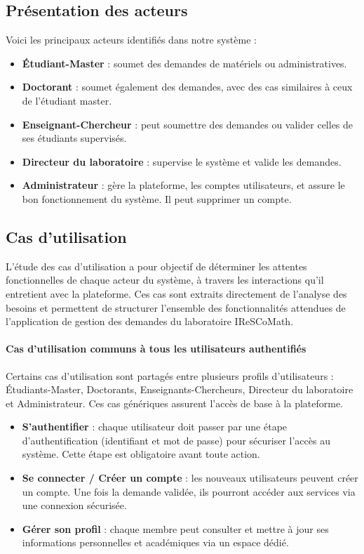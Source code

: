 \subsection{Présentation des acteurs}

Voici les principaux acteurs identifiés dans notre système :

\begin{itemize}
  \item \textbf{Étudiant-Master} : soumet des demandes de matériels ou administratives.
  \item \textbf{Doctorant} : soumet également des demandes, avec des cas similaires à ceux de l'étudiant master.
  \item \textbf{Enseignant-Chercheur} : peut soumettre des demandes ou valider celles de ses étudiants supervisés.
  \item \textbf{Directeur du laboratoire} : supervise le système et valide les demandes.
  \item \textbf{Administrateur} : gère la plateforme, les comptes utilisateurs, et assure le bon fonctionnement du système. Il peut supprimer un compte.
\end{itemize}


\subsection{Cas d’utilisation }

L’étude des cas d’utilisation a pour objectif de déterminer les attentes fonctionnelles de chaque acteur du système, à travers les interactions qu’il entretient avec la plateforme. Ces cas sont extraits directement de l’analyse des besoins et permettent de structurer l’ensemble des fonctionnalités attendues de l’application de gestion des demandes du laboratoire IReSCoMath.

\paragraph{Cas d’utilisation communs à tous les utilisateurs authentifiés}

Certains cas d’utilisation sont partagés entre plusieurs profils d’utilisateurs : Étudiants-Master, Doctorants, Enseignants-Chercheurs, Directeur du laboratoire et Administrateur. Ces cas génériques assurent l’accès de base à la plateforme.

\begin{itemize}
\item \textbf{S’authentifier} : chaque utilisateur doit passer par une étape d’authentification (identifiant et mot de passe) pour sécuriser l’accès au système. Cette étape est obligatoire avant toute action.
\item \textbf{Se connecter / Créer un compte} : les nouveaux utilisateurs peuvent créer un compte. Une fois la demande validée, ils pourront accéder aux services via une connexion sécurisée.
\item \textbf{Gérer son profil} : chaque membre peut consulter et mettre à jour ses informations personnelles et académiques via un espace dédié.
\end{itemize}

